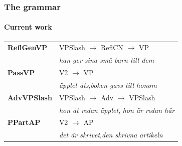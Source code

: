 \documentclass[10pt]{beamer}
\begin{document}
\begin{frame}
\frametitle{The grammar}
\framesubtitle{Current work} 
\begin{tabular}{ll}
\alert{\textbf{ReflGenVP}} & \alert{VPSlash $\rightarrow$ ReflCN $\rightarrow$ VP} \\
& \alert{\emph{han ger sina små barn till dem}} \\

\alert{\textbf{PassVP}}
  & \alert{V2 $\rightarrow$ VP} \\ %
& \alert{\emph{äpplet åts},}\alert{\emph{boken gavs till honom}} \\ 

\textbf{AdvVPSlash} & VPSlash $\rightarrow$ Adv $\rightarrow$ VPSlash \\
& \emph{hon åt redan äpplet}, \emph{hon är redan här}\\

\alert{\textbf{PPartAP}} & \alert{V2 $\rightarrow$ AP} \\
& \alert{\emph{det är skrivet},\emph{den skrivna artikeln}}
\end{tabular}\\
\end{frame}
\end{document}
